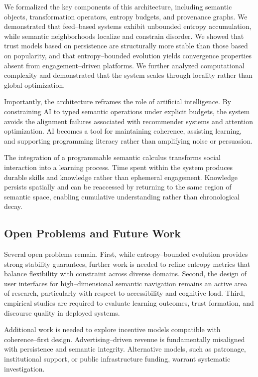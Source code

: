 \documentclass[11pt]{article}
\begin{document}
We formalized the key components of this architecture, including semantic objects,
transformation operators, entropy budgets, and provenance graphs. We demonstrated that
feed--based systems exhibit unbounded entropy accumulation, while semantic neighborhoods
localize and constrain disorder. We showed that trust models based on persistence are
structurally more stable than those based on popularity, and that entropy--bounded
evolution yields convergence properties absent from engagement--driven platforms. We
further analyzed computational complexity and demonstrated that the system scales through
locality rather than global optimization.

Importantly, the architecture reframes the role of artificial intelligence. By constraining
AI to typed semantic operations under explicit budgets, the system avoids the alignment
failures associated with recommender systems and attention optimization. AI becomes a tool
for maintaining coherence, assisting learning, and supporting programming literacy rather
than amplifying noise or persuasion.

The integration of a programmable semantic calculus transforms social interaction into a
learning process. Time spent within the system produces durable skills and knowledge rather
than ephemeral engagement. Knowledge persists spatially and can be reaccessed by returning
to the same region of semantic space, enabling cumulative understanding rather than
chronological decay.

\subsection{Open Problems and Future Work}

Several open problems remain. First, while entropy--bounded evolution provides strong
stability guarantees, further work is needed to refine entropy metrics that balance
flexibility with constraint across diverse domains. Second, the design of user interfaces
for high--dimensional semantic navigation remains an active area of research, particularly
with respect to accessibility and cognitive load. Third, empirical studies are required to
evaluate learning outcomes, trust formation, and discourse quality in deployed systems.

Additional work is needed to explore incentive models compatible with coherence--first
design. Advertising--driven revenue is fundamentally misaligned with persistence and
semantic integrity. Alternative models, such as patronage, institutional support, or
public infrastructure funding, warrant systematic investigation.
\end{document}
